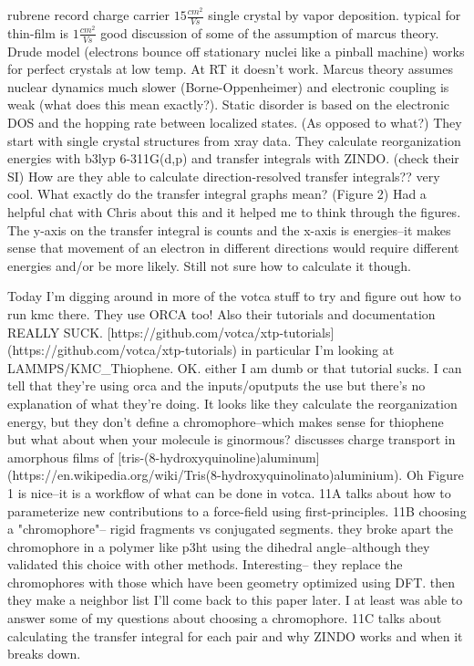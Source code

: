 \documentclass{article}
\begin{document}
\cite{Vehoff2010a}
rubrene record charge carrier $15 \frac{cm^{2}}{V s}$ single crystal by vapor deposition. typical for thin-film is $1 \frac{cm^{2}}{V s}$
good discussion of some of the assumption of marcus theory. 
Drude model (electrons bounce off stationary nuclei like a pinball machine) works for perfect crystals at low temp.
At RT it doesn't work. Marcus theory assumes nuclear dynamics much slower (Borne-Oppenheimer) and electronic coupling is weak (what does this mean exactly?). Static disorder is based on the electronic DOS and the hopping rate between localized states. (As opposed to what?)
They start with single crystal structures from xray data. They calculate reorganization energies with b3lyp 6-311G(d,p) and transfer integrals with ZINDO. (check their SI)
How are they able to calculate direction-resolved transfer integrals?? very cool. What exactly do the transfer integral graphs mean? (Figure 2) Had a helpful chat with Chris about this and it helped me to think through the figures. The y-axis on the transfer integral is counts and the x-axis is energies--it makes sense that movement of an electron in different directions would require different energies and/or be more likely. Still not sure how to calculate it though. 

Today I'm digging around in more of the votca stuff to try and figure out how to run kmc there. They use ORCA too! Also their tutorials and documentation REALLY SUCK. [https://github.com/votca/xtp-tutorials](https://github.com/votca/xtp-tutorials) in particular I'm looking at LAMMPS/KMC\_Thiophene.
OK. either I am dumb or that tutorial sucks. I can tell that they're using orca and the inputs/oputputs the use but there's no explanation of what they're doing. It looks like they calculate the reorganization energy, but they don't define a chromophore--which makes sense for thiophene but what about when your molecule is ginormous?
\cite{Ruhle2011b} discusses charge transport in amorphous films of [tris-(8-hydroxyquinoline)aluminum](https://en.wikipedia.org/wiki/Tris(8-hydroxyquinolinato)aluminium). Oh Figure 1 is nice--it is a workflow of what can be done in votca.
11A talks about how to parameterize new contributions to a force-field using first-principles.
11B choosing a "chromophore"-- rigid fragments vs conjugated segments. they broke apart the chromophore in a polymer like p3ht using the dihedral angle--although they validated this choice with other methods. Interesting-- they replace the chromophores with those which have been geometry optimized using DFT. then they make a neighbor list
I'll come back to this paper later. I at least was able to answer some of my questions about choosing a chromophore.
11C talks about calculating the transfer integral for each pair and why ZINDO works and when it breaks down.



\end{document}

